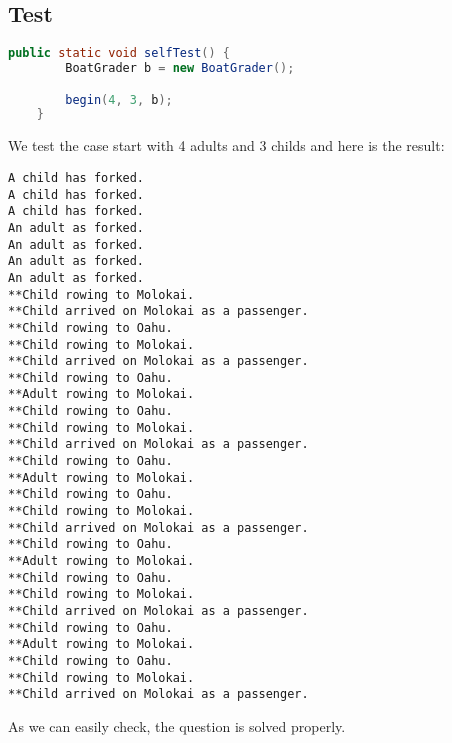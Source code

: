 \documentclass{article}
\begin{document}
\subsection{Test}
\begin{lstlisting}[language=java]
	public static void selfTest() {
		BoatGrader b = new BoatGrader();

		begin(4, 3, b);
	}
\end{lstlisting}
We test the case start with 4 adults and 3 childs and here is the result:
\begin{lstlisting}
A child has forked.
A child has forked.
A child has forked.
An adult as forked.
An adult as forked.
An adult as forked.
An adult as forked.
**Child rowing to Molokai.
**Child arrived on Molokai as a passenger.
**Child rowing to Oahu.
**Child rowing to Molokai.
**Child arrived on Molokai as a passenger.
**Child rowing to Oahu.
**Adult rowing to Molokai.
**Child rowing to Oahu.
**Child rowing to Molokai.
**Child arrived on Molokai as a passenger.
**Child rowing to Oahu.
**Adult rowing to Molokai.
**Child rowing to Oahu.
**Child rowing to Molokai.
**Child arrived on Molokai as a passenger.
**Child rowing to Oahu.
**Adult rowing to Molokai.
**Child rowing to Oahu.
**Child rowing to Molokai.
**Child arrived on Molokai as a passenger.
**Child rowing to Oahu.
**Adult rowing to Molokai.
**Child rowing to Oahu.
**Child rowing to Molokai.
**Child arrived on Molokai as a passenger.
\end{lstlisting}
As we can easily check, the question is solved properly.
\end{document}
